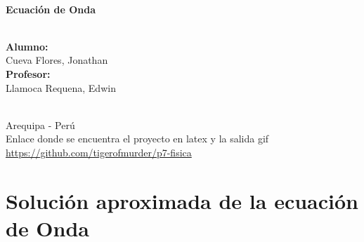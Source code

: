 \documentclass{article}
\begin{document}
\begin{titlepage}
\HRule \\[0.3cm]
{\huge \bfseries Ecuación de Onda}\\[0.3cm]
\HRule \\[0.3cm]

\begin{minipage}{0.7\textwidth}
    \begin{flushleft} 
        \Large{\textbf{Alumno:}}\\[0.3cm]
        {\Large{Cueva Flores, Jonathan}}\\[0.5cm]
        \Large{\textbf{Profesor:}}\\[0.3cm]
    {\LARGE{Llamoca Requena, Edwin}}\\[0.5cm]
    \end{flushleft}

\end{minipage}\\[1cm]

{\Large Arequipa - Perú}\\[1.2cm] 
\vfill 
{\Large Enlace donde se encuentra el proyecto en latex y la salida gif}
{\Large \url{https://github.com/tigerofmurder/p7-fisica}}
\end{titlepage}
\section{Solución aproximada de la ecuación de Onda}
\end{document}
